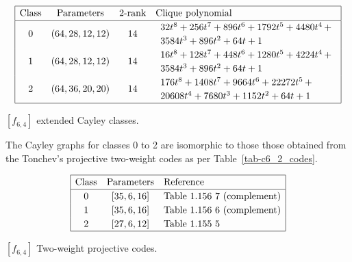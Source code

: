 \documentclass[12pt,a4paper]{article}
\begin{document}
\begin{table}[!bhpt] %
%
\small{}
\begin{align*}
\def\arraystretch{1.2}
\begin{array}{|cccl|}
\hline
\text{Class} &
\text{Parameters} &
\text{2-rank} &
\text{Clique polynomial}
\\
\hline
0 &
(64, 28, 12, 12) &
14 &
\begin{array}{l}
32t^{8} + 256t^{7} + 896t^{6} + 1792t^{5} + 4480t^{4}
\,+
\\
 3584t^{3} + 896t^{2} + 64t + 1
\end{array}
\\
1 &
(64, 28, 12, 12) &
14 &
\begin{array}{l}
16t^{8} + 128t^{7} + 448t^{6} + 1280t^{5} + 4224t^{4}
\,+
\\
 3584t^{3} + 896t^{2} + 64t + 1
\end{array}
\\
2 &
(64, 36, 20, 20) &
14 &
\begin{array}{l}
176t^{8} + 1408t^{7} + 9664t^{6} + 22272t^{5}
\,+
\\
 20608t^{4} + 7680t^{3} + 1152t^{2} + 64t + 1
\end{array}
\\
\hline
\end{array}
\end{align*}
\caption{$[f_{6,4}]$ extended Cayley classes.}
\label{tab-c6_4_EC_classes}
\end{table}

The Cayley graphs for classes 0 to 2 are isomorphic to those those obtained from the
Tonchev's projective two-weight codes \cite{Ton07codes} as per Table~\ref{tab-c6_2_codes}.

\begin{table}[!bhpt] %
\small{
\begin{align*}
\def\arraystretch{1.2}
\begin{array}{|ccl|}
\hline
\text{Class} &
\text{Parameters} & \text{Reference}
\\
\hline
0 & [35,6,16] & \text{Table 1.156 7 (complement)}
\\
1 & [35,6,16] & \text{Table 1.156 6 (complement)}
\\
2 & [27,6,12] & \text{Table 1.155 5 }
\\
\hline
\end{array}
\end{align*}
}
\caption{$[f_{6,4}]$ Two-weight projective codes.}
\label{tab-c6_4_codes}
\end{table}
\end{document}

